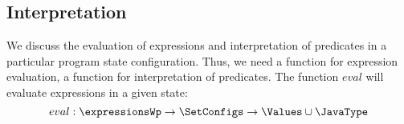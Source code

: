 \newtheorem{interpExpr}{Definition}[subsection]
\newtheorem{interpTypeExpr}[interpExpr]{Definition} 
\newtheorem{interpPred}[interpExpr]{Definition}
\newtheorem{valid}[interpExpr]{Definition}

\newtheorem{substHeap}{Lemma}[subsection]
\newtheorem{newHeap}[substHeap]{Lemma}
\newtheorem{substStack}[substHeap]{Lemma}
\newtheorem{substCntr}[substHeap]{Lemma}
\newtheorem{substLv}[substHeap]{Lemma}
\newtheorem{substRet}[substHeap]{Lemma}




\subsection{Interpretation }\label{interpret}

We discuss the evaluation of expressions and interpretation of predicates  in a particular program state configuration.
Thus, we need a function for expression evaluation, a function for interpretation of predicates. 
The function $eval$ will evaluate expressions in a given state:
$$
eval : \expressionsWp \rightarrow \SetConfigs \rightarrow \Values \cup \JavaType
$$




